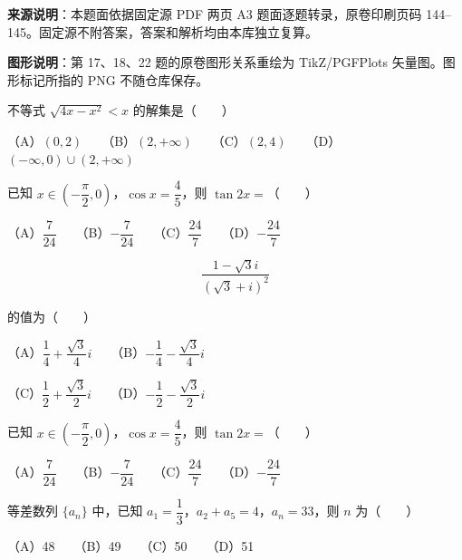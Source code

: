 


\begin{gktip}
\textbf{来源说明}：本题面依据固定源 PDF 两页 A3 题面逐题转录，原卷印刷页码 144–145。固定源不附答案，答案和解析均由本库独立复算。

\textbf{图形说明}：第 17、18、22 题的原卷图形关系重绘为 TikZ/PGFPlots 矢量图。图形标记所指的 PNG 不随仓库保存。
\end{gktip}


\begin{question}
不等式 $\sqrt{4x-x^2}<x$ 的解集是\mbox{（　　）}

（A）$(0,2)$　　（B）$(2,+\infty)$　　（C）$(2,4)$　　（D）$(-\infty,0)\cup(2,+\infty)$

\end{question}
\begin{question}
已知 $x\in\left(-\dfrac\pi2,0\right)$，$\cos x=\dfrac45$，则 $\tan2x=$\mbox{（　　）}

（A）$\dfrac7{24}$　　（B）$-\dfrac7{24}$　　（C）$\dfrac{24}{7}$　　（D）$-\dfrac{24}{7}$

\end{question}
\begin{question}

\nopagebreak[4]
\[
\frac{1-\sqrt3 i}{(\sqrt3+i)^2}
\]

的值为\mbox{（　　）}

（A）$\dfrac14+\dfrac{\sqrt3}{4}i$　　（B）$-\dfrac14-\dfrac{\sqrt3}{4}i$

（C）$\dfrac12+\dfrac{\sqrt3}{2}i$　　（D）$-\dfrac12-\dfrac{\sqrt3}{2}i$

\end{question}
\begin{question}
已知 $x\in\left(-\dfrac\pi2,0\right)$，$\cos x=\dfrac45$，则 $\tan2x=$\mbox{（　　）}

（A）$\dfrac7{24}$　　（B）$-\dfrac7{24}$　　（C）$\dfrac{24}{7}$　　（D）$-\dfrac{24}{7}$

\end{question}
\begin{question}
等差数列 $\{a_n\}$ 中，已知 $a_1=\dfrac13$，$a_2+a_5=4$，$a_n=33$，则 $n$ 为\mbox{（　　）}

（A）48　　（B）49　　（C）50　　（D）51

\end{question}
